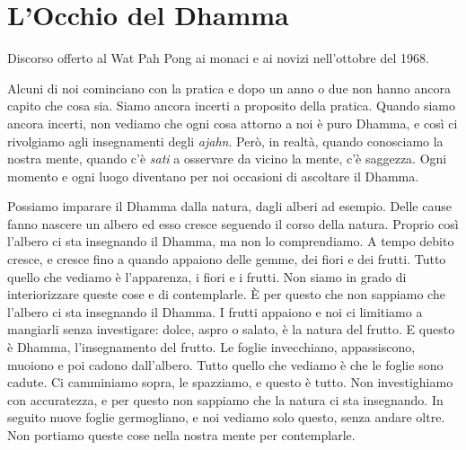 \chapter{L'Occhio del Dhamma}

\begin{openingQuote}
  \centering

  Discorso offerto al Wat Pah Pong ai monaci e ai novizi nell'ottobre del 1968.
\end{openingQuote}

Alcuni di noi cominciano con la pratica e dopo un anno o due non hanno
ancora capito che cosa sia. Siamo ancora incerti a proposito della
pratica. Quando siamo ancora incerti, non vediamo che ogni cosa attorno
a noi è puro Dhamma, e così ci rivolgiamo agli insegnamenti degli
\emph{ajahn}. Però, in realtà, quando conosciamo la nostra mente, quando
c'è \emph{sati} a osservare da vicino la mente, c'è saggezza. Ogni
momento e ogni luogo diventano per noi occasioni di ascoltare il Dhamma.

Possiamo imparare il Dhamma dalla natura, dagli alberi ad esempio. Delle
cause fanno nascere un albero ed esso cresce seguendo il corso della
natura. Proprio così l'albero ci sta insegnando il Dhamma, ma non lo
comprendiamo. A tempo debito cresce, e cresce fino a quando appaiono
delle gemme, dei fiori e dei frutti. Tutto quello che vediamo è
l'apparenza, i fiori e i frutti. Non siamo in grado di interiorizzare
queste cose e di contemplarle. È per questo che non sappiamo che
l'albero ci sta insegnando il Dhamma. I frutti appaiono e noi ci
limitiamo a mangiarli senza investigare: dolce, aspro o salato, è la
natura del frutto. E questo è Dhamma, l'insegnamento del frutto. Le
foglie invecchiano, appassiscono, muoiono e poi cadono dall'albero.
Tutto quello che vediamo è che le foglie sono cadute. Ci camminiamo
sopra, le spazziamo, e questo è tutto. Non investighiamo con
accuratezza, e per questo non sappiamo che la natura ci sta insegnando.
In seguito nuove foglie germogliano, e noi vediamo solo questo, senza
andare oltre. Non portiamo queste cose nella nostra mente per
contemplarle.


